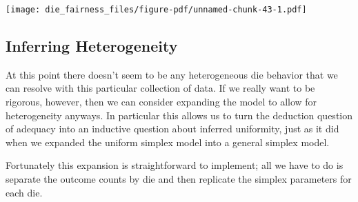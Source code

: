 \documentclass[
  letterpaper,
  DIV=11,
  numbers=noendperiod]{scrartcl}
\newenvironment{Shaded}{\begin{snugshade}}{\end{snugshade}}
\newcommand{\AttributeTok}[1]{\textcolor[rgb]{0.40,0.45,0.13}{#1}}
\newcommand{\DecValTok}[1]{\textcolor[rgb]{0.68,0.00,0.00}{#1}}
\newcommand{\FunctionTok}[1]{\textcolor[rgb]{0.28,0.35,0.67}{#1}}
\newcommand{\NormalTok}[1]{\textcolor[rgb]{0.00,0.23,0.31}{#1}}
\newcommand{\SpecialCharTok}[1]{\textcolor[rgb]{0.37,0.37,0.37}{#1}}
\newcommand{\StringTok}[1]{\textcolor[rgb]{0.13,0.47,0.30}{#1}}
\begin{document}
\begin{Shaded}
\end{Shaded}

\texttt{[image: die\_fairness\_files/figure-pdf/unnamed-chunk-43-1.pdf]}

\subsection{Inferring Heterogeneity}\label{inferring-heterogeneity}

At this point there doesn't seem to be any heterogeneous die behavior
that we can resolve with this particular collection of data. If we
really want to be rigorous, however, then we can consider expanding the
model to allow for heterogeneity anyways. In particular this allows us
to turn the deduction question of adequacy into an inductive question
about inferred uniformity, just as it did when we expanded the uniform
simplex model into a general simplex model.

Fortunately this expansion is straightforward to implement; all we have
to do is separate the outcome counts by die and then replicate the
simplex parameters for each die.
\end{document}
